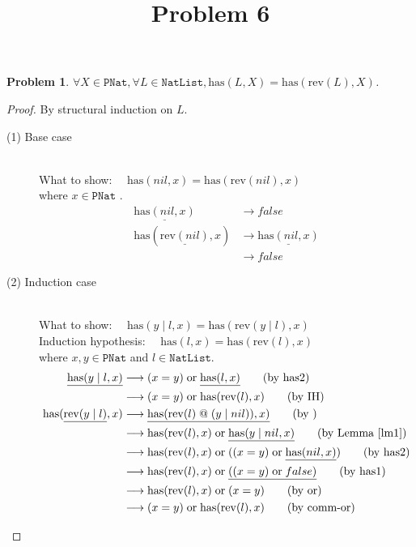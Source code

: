 \documentclass[12pt, a4paper]{article}
\title{Problem 6}
\date{\vspace{-5ex}}
\newtheorem{problem}{Problem}
\newcommand{\rel}[1]{\mathrel{#1}}
\newcommand{\rmx}[1]{\mathrm{#1}}
\newcommand{\larrow}{\longrightarrow}
\newcommand{\under}{\underline}
\begin{document}
\maketitle

\begin{problem}
$\forall X \in \mathtt{PNat}, \forall L \in \mathtt{NatList}, \rmx{has}(L, X) = \rmx{has}(\rmx{rev}(L), X)$.
\end{problem}
\begin{proof}
By structural induction on $L$.

\begin{description}
\item[(1) Base case]~\\
\noindent
What to show: $\quad \rmx{has}(nil, x) = \rmx{has}(\rmx{rev}(nil), x)$ \\
where $x \in \mathtt{PNat}$ .
\begin{align*}
\under{\rmx{has}(nil, x)}
	&\larrow false \tag{by has1} \\
\rmx{has}(\under{\rmx{rev}(nil)}, x)
	&\larrow \under{\rmx{has}(nil, x)} \tag{by rev1} \\
	&\larrow false \tag{by has1}
\end{align*}

\item[(2) Induction case]~\\
What to show: $\quad \rmx{has}(y \rel{|} l, x) = \rmx{has}(\rmx{rev}(y \rel{|} l), x)$ \\
Induction hypothesis: $\quad \rmx{has}(l, x) = \rmx{has}(\rmx{rev}(l), x)$  \\
where $x, y \in \mathtt{PNat}$ and $l \in \mathtt{NatList}$.
\begin{align*}
\under{\rmx{has}(y \rel{|} l, x)}
	&\larrow (x = y) \rel{\rmx{or}} \under{\rmx{has}(l, x)}  \tag{by has2} \\
	&\larrow (x = y) \rel{\rmx{or}} \rmx{has}(\rmx{rev}(l), x)  \tag{by IH} \\
\rmx{has}(\under{\rmx{rev}(y \rel{|} l)}, x)
	&\larrow \under{\rmx{has}(\rmx{rev}(l) \rel{@} (y \rel{|} nil)), x)} \tag{by } \\
	&\larrow \rmx{has}(\rmx{rev}(l), x) \rel{\rmx{or}} \under{\rmx{has}(y \rel{|} nil, x)} \tag{by Lemma~\ref{lm1}} \\
	&\larrow \rmx{has}(\rmx{rev}(l), x) \rel{\rmx{or}} ((x = y) \rel{\rmx{or}} \under{\rmx{has}(nil, x)}) \tag{by has2} \\
	&\larrow \rmx{has}(\rmx{rev}(l), x) \rel{\rmx{or}} \under{((x = y) \rel{\rmx{or}} false)} \tag{by has1} \\
	&\larrow \rmx{has}(\rmx{rev}(l), x) \rel{\rmx{or}} (x = y) \tag{by or} \\
	&\larrow (x = y) \rel{\rmx{or}} \rmx{has}(\rmx{rev}(l), x) \tag{by comm-or}
\end{align*}

\end{description}

\end{proof}
\end{document}
